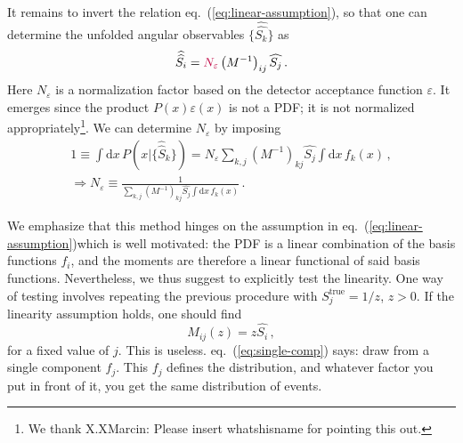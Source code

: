 \documentclass[aps,prd,reprint,nofootinbib,preprintnumbers]{revtex4}
\newcommand{\est}[1]{\widehat{#1}}
\newcommand{\refeq}[1]{eq.~(\ref{eq:#1})}
\newcommand{\rmdx}[1]{\mbox{d} #1 \,} %
\let\eps\varepsilon
\newcommand{\wwhat}[1]{\widehat{\widehat{#1}}}
\newcommand{\danny}[1]{{\color{purple}#1}}
\newcommand{\fred}[1]{{\color{brown!85!black}#1}}
\begin{document}
It remains to invert the relation \refeq{linear-assumption}, so that one can determine the unfolded
angular observables $\lbrace \wwhat{S_k}\rbrace$ as
\begin{equation}
    \wwhat{S_i} = \danny{N_\eps} \left(M^{-1}\right)_{ij} \est{S_j}\,.
\end{equation}
\danny{Here $N_\eps$ is a normalization factor based on the detector acceptance function $\eps$. It emerges
    since the product $P(x) \eps(x)$ is not a PDF; it is not normalized appropriately\footnote{We thank
    X.X\danny{Marcin: Please insert whatshisname} for pointing this out.}. We can determine $N_\eps$ by
    imposing
    \begin{gather}
        1 \equiv \int \rmdx{x} P(x | \lbrace \wwhat{S}_k\rbrace) = N_\eps \sum_{k,j} \left(M^{-1}\right)_{kj} \est{S_j}\int \rmdx{x} f_k(x)\,,\\
        \Rightarrow N_\eps \equiv \frac{1}{\sum_{k,j} \left(M^{-1}\right)_{kj} \est{S_j} \int \rmdx{x} f_k(x)}\,.
    \end{gather}
}

We emphasize that this method hinges on the assumption in \refeq{linear-assumption}\danny{which is well motivated:
the PDF is a linear combination of the basis functions $f_i$, and the moments are therefore a linear
functional of said basis functions. Nevertheless,}
we thus suggest to explicitly
test the linearity. One way of testing involves repeating the previous procedure
with $S_j^\text{true} = 1/z$, $z > 0$. If the linearity assumption holds, one should find
\begin{equation}
    M_{ij}(z) = z \est{S_i}\,,
\end{equation}
for a fixed value of $j$. \fred{This is useless. \refeq{single-comp}
  says: draw from a single component $f_j$. This $f_j$ defines the
  distribution, and whatever factor you put in front of it, you get
  the same distribution of events.}
\end{document}
